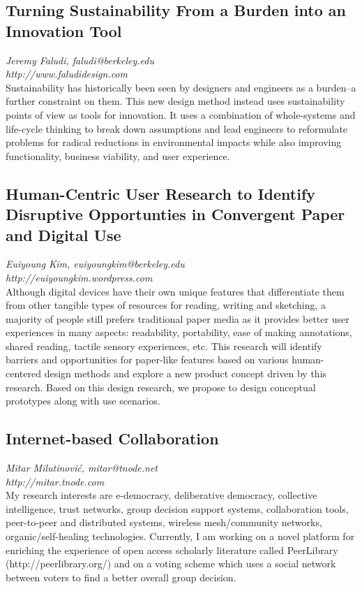 \documentclass[foldmark,10pt,a4paper,notumble]{leaflet}
\begin{document}
\subsection{Turning Sustainability From a Burden into an Innovation Tool}
\emph{Jeremy Faludi, faludi@berkeley.edu}\\
\emph{http://www.faludidesign.com}\\
Sustainability has historically been seen by designers and engineers as a burden--a further constraint on them.  This new design method instead uses sustainability points of view as tools for innovation.  It uses a combination of whole-systems and life-cycle thinking to break down assumptions and lead engineers to reformulate problems for radical reductions in environmental impacts while also improving functionality, business viability, and user experience.

\subsection{Human-Centric User Research to Identify Disruptive Opportunties in Convergent Paper and Digital Use}
\emph{Euiyoung Kim, euiyoungkim@berkeley.edu}\\
\emph{http://euiyoungkim.wordpress.com}\\
Although digital devices have their own unique features that differentiate them from other
tangible types of resources for reading, writing and sketching, a majority of people still prefers traditional
paper media as it provides better user experiences in many aspects: readability, portability, ease of
making annotations, shared reading, tactile sensory experiences, etc. This research will identify
barriers and opportunities for paper-like features based on various human-centered design methods and
explore a new product concept driven by this research. Based on this design research, we propose to
design conceptual prototypes along with use scenarios. 

\subsection{Internet-based Collaboration}
\emph{Mitar Milutinovi\'c, mitar@tnode.net}\\
\emph{http://mitar.tnode.com}\\
My research interests are e-democracy, deliberative democracy,
collective intelligence, trust networks, group decision support systems,
collaboration tools, peer-to-peer and distributed systems, wireless
mesh/community networks, organic/self-healing technologies. Currently, I
am working on a novel platform for enriching the experience of open
access scholarly literature called PeerLibrary (http://peerlibrary.org/)
and on a voting scheme which uses a social network between voters to
find a better overall group decision.
\end{document}
